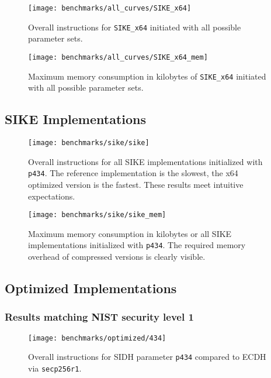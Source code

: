 \begin{figure}[H]
  \centering
  \texttt{[image: benchmarks/all\_curves/SIKE\_x64]}
  \caption[Overall instructions for all parameter sets via \texttt{SIKE\_x64}]
  {Overall instructions for \texttt{SIKE\_x64} initiated with all possible parameter sets.}
  \label{fig:results_ms_all_curves}
\end{figure}

\begin{figure}[H]
  \centering
  \texttt{[image: benchmarks/all\_curves/SIKE\_x64\_mem]}
  \caption[Maximum memory consumption for all parameter sets via \texttt{SIKE\_x64}]
  {Maximum memory consumption in kilobytes of \texttt{SIKE\_x64} initiated with all possible parameter sets.}
  \label{fig:results_ms_all_curves_mem<}
\end{figure}

\subsection{SIKE Implementations}\label{sec:results_sike}
\begin{figure}[H]
  \centering
  \texttt{[image: benchmarks/sike/sike]}
  \caption[Overall instructions SIKE]
  {Overall instructions for all SIKE implementations initialized with \texttt{p434}. The reference implementation is the slowest, the x64 optimized version is the fastest. These results meet intuitive expectations.}
  \label{fig:results_sike}
\end{figure}

\begin{figure}[H]
  \centering
  \texttt{[image: benchmarks/sike/sike\_mem]}
  \caption[Maximum memory consumption SIKE]
  {Maximum memory consumption in kilobytes or all SIKE implementations initialized with \texttt{p434}. The required memory overhead of compressed versions is clearly visible.}
  \label{fig:results_sike_mem}
\end{figure}


\subsection{Optimized Implementations}\label{sec:results_optimized}
\subsubsection{Results matching NIST security level 1}
\begin{figure}[H]
  \centering
  \texttt{[image: benchmarks/optimized/434]}
  \caption[Overall instructions p434]
  {Overall instructions for SIDH parameter \texttt{p434} compared to ECDH via \texttt{secp256r1}.}
  \label{fig:results_opt_434}
\end{figure}

